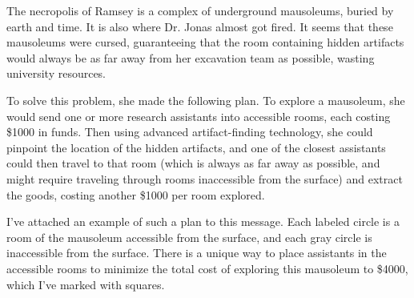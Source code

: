 The necropolis of Ramsey is a complex of underground mausoleums, buried by earth and time.
It is also where Dr. Jonas almost got fired. It seems that these mausoleums were cursed,
guaranteeing that the room containing hidden artifacts would always be as far away from her
excavation team as possible, wasting university resources.

To solve this problem, she made the following plan. To explore a mausoleum, she would
send one or more research assistants into accessible rooms, each costing \$1000 in funds.
Then using advanced artifact-finding technology, she could pinpoint the location of the
hidden artifacts, and one of the closest assistants could then travel to that room 
(which is always as far away as possible, and might require traveling
through rooms inaccessible from the surface) and
extract the goods, costing another \$1000 per room explored.

I've attached an example of such a plan to this message. Each labeled circle
is a room of the mausoleum accessible from the surface, and each gray circle
is inaccessible from the surface. There is a unique way to place assistants 
in the accessible rooms to minimize the total
cost of exploring this mausoleum to \$4000, which I've marked with squares.
 
